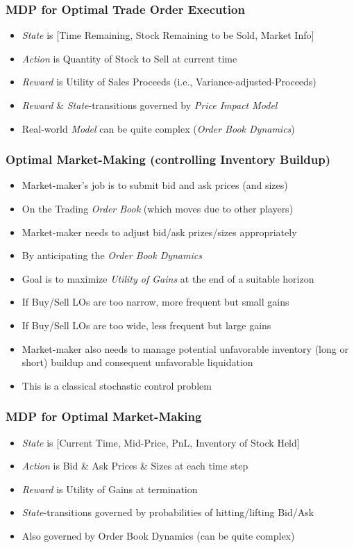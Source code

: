 \documentclass[handout]{beamer}
\begin{document}
\begin{frame}
\frametitle{MDP for Optimal Trade Order Execution}
\pause
\begin{itemize}[<+->]
\item {\em State} is [Time Remaining, Stock Remaining to be Sold, Market Info]
\item {\em Action} is Quantity of Stock to Sell at current time
\item {\em Reward} is Utility of Sales Proceeds (i.e., Variance-adjusted-Proceeds)
\item {\em Reward} \& {\em State}-transitions governed by {\em Price Impact Model}
\item Real-world {\em Model} can be quite complex ({\em Order Book Dynamics})
\end{itemize}
\end{frame}

\begin{frame}
\frametitle{Optimal Market-Making (controlling Inventory Buildup)}
\pause
\begin{itemize}[<+->]
\item Market-maker's job is to submit bid and ask prices (and sizes)
\item On the Trading {\em Order Book} (which moves due to other players)
\item Market-maker needs to adjust bid/ask prizes/sizes appropriately
\item By anticipating the {\em Order Book Dynamics}
\item Goal is to maximize {\em Utility of Gains} at the end of a suitable horizon
\item If Buy/Sell LOs are too narrow, more frequent but small gains
\item If Buy/Sell LOs are too wide, less frequent but large gains
\item Market-maker also needs to manage potential unfavorable inventory (long or short) buildup and consequent unfavorable liquidation
\item This is a classical stochastic control problem
\end{itemize}
\end{frame}

\begin{frame}
\frametitle{MDP for Optimal Market-Making}
\pause
\begin{itemize}[<+->]
\item {\em State} is [Current Time, Mid-Price, PnL, Inventory of Stock Held]
\item {\em Action} is Bid \& Ask Prices \& Sizes at each time step
\item {\em Reward} is Utility of Gains at termination
\item {\em State}-transitions governed by probabilities of hitting/lifting Bid/Ask
\item Also governed by Order Book Dynamics (can be quite complex)
\end{itemize}
\end{frame}
\end{document}
